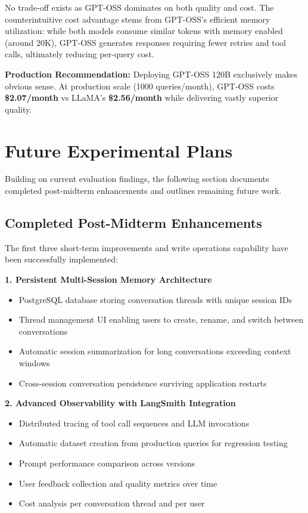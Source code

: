 \documentclass{article}
\begin{document}
No trade-off exists as GPT-OSS dominates on both quality and cost. The counterintuitive cost advantage stems from GPT-OSS's efficient memory utilization: while both models consume similar tokens with memory enabled (around 20K), GPT-OSS generates responses requiring fewer retries and tool calls, ultimately reducing per-query cost.

\textbf{Production Recommendation:} Deploying GPT-OSS 120B exclusively makes obvious sense. At production scale (1000 queries/month), GPT-OSS costs \textbf{\$2.07/month} vs LLaMA's \textbf{\$2.56/month} while delivering vastly superior quality.


\section{Future Experimental Plans}

Building on current evaluation findings, the following section documents completed post-midterm enhancements and outlines remaining future work.

\subsection{Completed Post-Midterm Enhancements}

The first three short-term improvements and write operations capability have been successfully implemented:

\textbf{1. Persistent Multi-Session Memory Architecture}

\begin{itemize}
\item PostgreSQL database storing conversation threads with unique session IDs
\item Thread management UI enabling users to create, rename, and switch between conversations
\item Automatic session summarization for long conversations exceeding context windows
\item Cross-session conversation persistence surviving application restarts
\end{itemize}

\textbf{2. Advanced Observability with LangSmith Integration}

\begin{itemize}
\item Distributed tracing of tool call sequences and LLM invocations
\item Automatic dataset creation from production queries for regression testing
\item Prompt performance comparison across versions
\item User feedback collection and quality metrics over time
\item Cost analysis per conversation thread and per user
\end{itemize}
\end{document}
